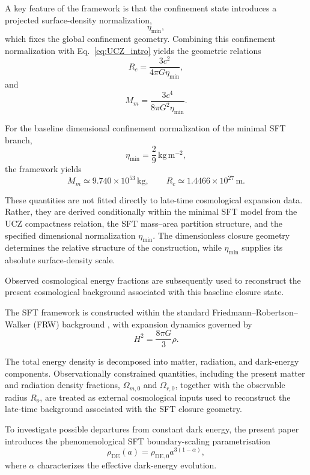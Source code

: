 \documentclass[12pt]{article}
\begin{document}
A key feature of the framework is that the confinement state introduces
a projected surface-density normalization,
\[
\eta_{\min},
\]
which fixes the global confinement geometry. Combining this confinement
normalization with Eq.~\eqref{eq:UCZ_intro} yields the geometric
relations
\begin{equation}
R_c
=
\frac{3c^2}{4\pi G\eta_{\min}},
\label{eq:Rc_intro}
\end{equation}
and
\begin{equation}
M_m
=
\frac{3c^4}{8\pi G^2\eta_{\min}}.
\label{eq:Mm_intro}
\end{equation}

For the baseline dimensional confinement normalization of the minimal
SFT branch,
\[
\eta_{\min}
=
\frac{2}{9}\,\mathrm{kg\,m^{-2}},
\]
the framework yields
\[
M_m
\simeq
9.740\times10^{53}\,\mathrm{kg},
\qquad
R_c
\simeq
1.4466\times10^{27}\,\mathrm{m}.
\]

These quantities are not fitted directly to late-time cosmological
expansion data. Rather, they are derived conditionally within the
minimal SFT model from the UCZ compactness relation, the SFT
mass--area partition structure, and the specified dimensional
normalization $\eta_{\min}$. The dimensionless closure geometry
determines the relative structure of the construction, while
$\eta_{\min}$ supplies its absolute surface-density scale.

Observed cosmological energy fractions are subsequently used to
reconstruct the present cosmological background associated with this
baseline closure state.

The SFT framework is constructed within the standard
Friedmann--Robertson--Walker (FRW) background
\cite{Friedmann1922,Robertson1935,Walker1937}, with expansion dynamics
governed by
\begin{equation}
H^2
=
\frac{8\pi G}{3}\rho.
\label{eq:friedmann_intro}
\end{equation}

The total energy density is decomposed into matter, radiation, and
dark-energy components. Observationally constrained quantities,
including the present matter and radiation density fractions,
\(\Omega_{m,0}\) and \(\Omega_{r,0}\), together with the observable
radius \(R_o\), are treated as external cosmological inputs used to
reconstruct the late-time background associated with the SFT closure
geometry.

To investigate possible departures from constant dark energy, the
present paper introduces the phenomenological SFT boundary-scaling
parametrisation
\begin{equation}
\rho_{\mathrm{DE}}(a)
=
\rho_{\mathrm{DE},0}a^{3(1-\alpha)},
\label{eq:DE_transport_intro}
\end{equation}
where $\alpha$ characterizes the effective dark-energy evolution.
\end{document}
